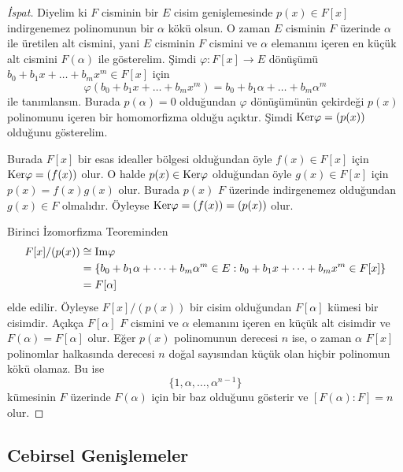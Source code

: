 \documentclass[draft]{article}
\theoremstyle{definition}
\theoremstyle{remark}
\begin{document}
			\begin{proof}[İspat]
			    Diyelim ki $F$ cisminin bir $E$ cisim genişlemesinde $p(x) \in F[x]$ indirgenemez polinomunun bir $\alpha$ kökü olsun. O zaman $E$ cisminin $F$ üzerinde $\alpha$ ile üretilen alt cismini, yani $E$ cisminin $F$ cismini ve $\alpha$ elemanını içeren en küçük alt cismini $F(\alpha)$ ile gösterelim. Şimdi $\varphi : F[x] \to E$ dönüşümü $b_0 + b_1x + \dots + b_mx^m \in F[x]$ için
			    \begin{equation*}
			        \varphi(b_0 + b_1x + \dots + b_mx^m) = b_0 + b_1\alpha + \dots + b_m\alpha^m
			    \end{equation*}
			    ile tanımlansın. Burada $p(\alpha) = 0$ olduğundan $\varphi$ dönüşümünün çekirdeği $p(x)$ polinomunu içeren bir homomorfizma olduğu açıktır. Şimdi $\textup{Ker}\varphi = (p(x))$ olduğunu gösterelim.\par
			    Burada $F[x]$ bir esas idealler bölgesi olduğundan öyle $f(x) \in F[x]$ için $\textup{Ker}\varphi = (f(x))$ olur. O halde $p(x) \in \textup{Ker}\varphi$ olduğundan öyle $g(x) \in F[x]$ için $p(x) = f(x)g(x)$ olur. Burada $p(x)$ $F$ üzerinde indirgenemez olduğundan $g(x) \in F$ olmalıdır. Öyleyse $\textup{Ker}\varphi = (f(x)) = (p(x))$ olur.\par
			    Birinci İzomorfizma Teoreminden
			    \begin{align*}
			        F[x]/(p(x)) &\cong \textup{Im}\varphi\\
			        &= \{b_0 + b_1\alpha + \dots + b_m\alpha^m \in E : b_0 + b_1x + \dots + b_mx^m \in F[x]\}\\
			        &= F[\alpha]
			    \end{align*}
			    elde edilir. Öyleyse $F[x]/(p(x))$ bir cisim olduğundan $F[\alpha]$ kümesi bir cisimdir. Açıkça $F[\alpha]$ $F$ cismini ve $\alpha$ elemanını içeren en küçük alt cisimdir ve $F(\alpha) = F[\alpha]$ olur. Eğer $p(x)$ polinomunun derecesi $n$ ise, o zaman $\alpha$ $F[x]$ polinomlar halkasında derecesi $n$ doğal sayısından küçük olan hiçbir polinomun kökü olamaz. Bu ise
			    \begin{equation*}
			        \{1, \alpha, \dots, \alpha^{n - 1}\}
			    \end{equation*}
			    kümesinin $F$ üzerinde $F(\alpha)$ için bir baz olduğunu gösterir ve $[F(\alpha) : F] = n$ olur.
			\end{proof}
			
		\subsection{Cebirsel Genişlemeler}
		
\end{document}
